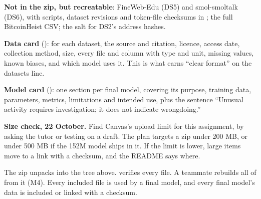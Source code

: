 \textbf{Not in the zip, but recreatable}: FineWeb-Edu (DS5) and smol-smoltalk (DS6), with scripts,
dataset revisions and token-file checksums in ; the full BitcoinHeist CSV; the
salt for DS2's address hashes.

\textbf{Data card} (): for each dataset, the source and citation, licence,
access date, collection method, size, every file and column with type and unit, missing values,
known biases, and which model uses it. This is what earns ``clear format'' on the datasets line.

\textbf{Model card} (): one section per final model, covering its purpose,
training data, parameters, metrics, limitations and intended use, plus the sentence ``Unusual
activity requires investigation; it does not indicate wrongdoing.''

\textbf{Size check, 22 October.} Find Canvas's upload limit for this assignment, by asking the
tutor or testing on a draft. The plan targets a zip under 200 MB, or under 500 MB if the 152M
model ships in it. If the limit is lower, large items move to a link with a checksum, and the
README says where.

\begin{done}
The zip unpacks into the tree above.  verifies every file. A teammate rebuilds
all of  from it (M4). Every included file is used by a final model, and every
final model's data is included or linked with a checksum.
\end{done}
